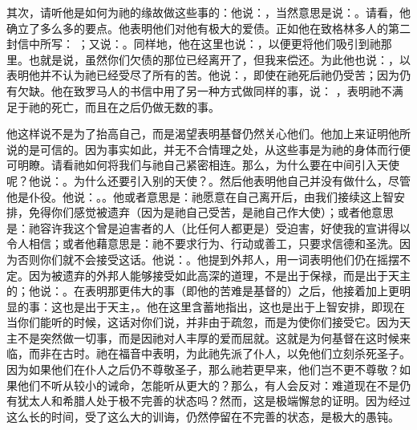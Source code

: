 其次，请听他是如何为祂的缘故做这些事的：他说：，当然意思是说：。请看，他确立了多么多的要点。他表明他们对他有极大的爱债。正如他在致格林多人的第二封信中所写： ；又说：。同样地，他在这里也说：，以便更将他们吸引到祂那里。也就是说，虽然你们欠债的那位已经离开了，但我来偿还。为此他也说：，以表明他并不认为祂已经受尽了所有的苦。他说：，即使在祂死后祂仍受苦；因为仍有欠缺。他在致罗马人的书信中用了另一种方式做同样的事，说： ，表明祂不满足于祂的死亡，而且在之后仍做无数的事。\par

他这样说不是为了抬高自己，而是渴望表明基督仍然关心他们。他加上来证明他所说的是可信的。因为事实如此，并无不合情理之处，从这些事是为祂的身体而行便可明瞭。请看祂如何将我们与祂自己紧密相连。那么，为什么要在中间引入天使呢？他说：。为什么还要引入别的天使？。然后他表明他自己并没有做什么，尽管他是仆役。他说：。。他或者意思是：祂愿意在自己离开后，由我们接续这上智安排，免得你们感觉被遗弃（因为是祂自己受苦，是祂自己作大使）；或者他意思是：祂容许我这个曾是迫害者的人（比任何人都更是）受迫害，好使我的宣讲得以令人相信；或者他藉意思是：祂不要求行为、行动或善工，只要求信德和圣洗。因为否则你们就不会接受这话。他说：。他提到外邦人，用一词表明他们仍在摇摆不定。因为被遗弃的外邦人能够接受如此高深的道理，不是出于保禄，而是出于天主的；他说：。在表明那更伟大的事（即他的苦难是基督的）之后，他接着加上更明显的事：这也是出于天主，。他在这里含蓄地指出，这也是出于上智安排，即现在当你们能听的时候，这话对你们说，并非由于疏忽，而是为使你们接受它。因为天主不是突然做一切事，而是因祂对人丰厚的爱而屈就。这就是为何基督在这时候来临，而非在古时。祂在福音中表明，为此祂先派了仆人，以免他们立刻杀死圣子。因为如果他们在仆人之后仍不尊敬圣子，那么祂若更早来，他们岂不更不尊敬？如果他们不听从较小的诫命，怎能听从更大的？那么，有人会反对：难道现在不是仍有犹太人和希腊人处于极不完善的状态吗？然而，这是极端懈怠的证明。因为经过这么长的时间，受了这么大的训诲，仍然停留在不完善的状态，是极大的愚钝。\par

